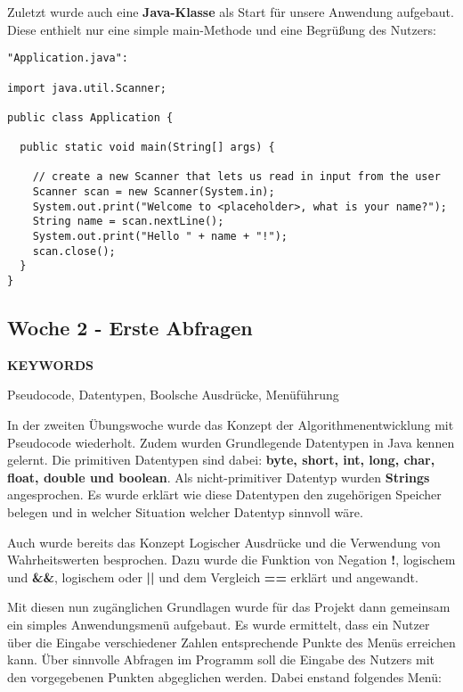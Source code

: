 Zuletzt wurde auch eine \textbf{Java-Klasse} als Start für unsere Anwendung aufgebaut. Diese enthielt nur eine simple main-Methode und eine Begrüßung des Nutzers:

\begin{verbatim}
"Application.java":

import java.util.Scanner;

public class Application {

  public static void main(String[] args) {
 
    // create a new Scanner that lets us read in input from the user
    Scanner scan = new Scanner(System.in);
    System.out.print("Welcome to <placeholder>, what is your name?");
    String name = scan.nextLine();
    System.out.print("Hello " + name + "!");
    scan.close();
  }
}
\end{verbatim}
\subsection{Woche 2 - Erste Abfragen}
\label{ch:weektwo}
\line
\begin{center}
	\textbf{KEYWORDS}
	
	Pseudocode, Datentypen, Boolsche Ausdrücke, Menüführung
\end{center}
\line
In der zweiten Übungswoche wurde das Konzept der Algorithmenentwicklung mit Pseudocode wiederholt. Zudem wurden Grundlegende Datentypen in Java kennen gelernt. Die primitiven Datentypen sind dabei: \textbf{byte, short, int, long, char, float, double und boolean}. Als nicht-primitiver Datentyp wurden \textbf{Strings} angesprochen. Es wurde erklärt wie diese Datentypen den zugehörigen Speicher belegen und in welcher Situation welcher Datentyp sinnvoll wäre.

Auch wurde bereits das Konzept Logischer Ausdrücke und die Verwendung von Wahrheitswerten besprochen. Dazu wurde die Funktion von Negation \textbf{!}, logischem und \textbf{\&\&}, logischem oder \textbf{||} und dem Vergleich \textbf{==} erklärt und angewandt.

Mit diesen nun zugänglichen Grundlagen wurde für das Projekt dann gemeinsam ein simples Anwendungsmenü aufgebaut. Es wurde ermittelt, dass ein Nutzer über die Eingabe verschiedener Zahlen entsprechende Punkte des Menüs erreichen kann. Über sinnvolle Abfragen im Programm soll die Eingabe des Nutzers mit den vorgegebenen Punkten abgeglichen werden. Dabei enstand folgendes Menü:

